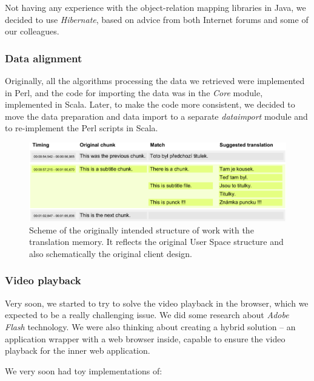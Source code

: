 Not having any experience with the object-relation mapping libraries in Java, we decided to use {\it Hibernate}, based on advice from both Internet forums and some of our colleagues.


\subsubsection{Data alignment}

Originally, all the algorithms processing the data we retrieved were implemented in Perl, and the code for importing the data was in the \emph{Core} module, implemented in Scala. Later, to make the code more consistent, we decided to move the data preparation and data import to a separate \emph{dataimport} module and to re-implement the Perl scripts in Scala.

\begin{figure}[h]
\begin{center}
\includegraphics{./figures/original_strucutre.pdf}
\end{center}

\caption{Scheme of the originally intended structure of work with the translation memory. It reflects the original User Space structure and also schematically the original client design.}\label{fig:original_scheme}

\end{figure}

\subsubsection{Video playback}

Very soon, we started to try to solve the video playback in the browser, which we expected to be a really challenging issue. We did some research about \emph{Adobe Flash} technology. We were also thinking about creating a hybrid solution -- an application wrapper with a web browser inside, capable to ensure the video playback for the inner web application.

We very soon had toy implementations of:

